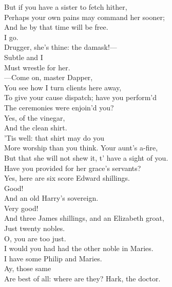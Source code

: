 \documentclass[a4paper,oneside]{memoir}
\begin{document}
\begin{drama*}
But if you have a sister to fetch hither,\\
Perhaps your own pains may command her sooner;\\
And he by that time will be free.\\
\kastrilspeaks {} I go.\\
\facespeaks Drugger, she's thine: the damask!---\\
Subtle and I\\
Must wrestle for her.\\
---Come on, master Dapper,\\
You see how I turn clients here away,\\
To give your cause dispatch; have you perform'd\\
The ceremonies were enjoin'd you?\\
\dapperspeaks {} Yes, of the vinegar,\\
And the clean shirt.\\
\facespeaks {} 'Tis well: that shirt may do you\\
More worship than you think. Your aunt's a-fire,\\
But that she will not shew it, t' have a sight of you.\\
Have you provided for her grace's servants?\\
\dapperspeaks Yes, here are six score Edward shillings.\\
\facespeaks {} Good!\\
\dapperspeaks And an old Harry's sovereign.\\
\facespeaks {} Very good!\\
\dapperspeaks And three James shillings, and an Elizabeth groat,\\
Just twenty nobles.\\
\facespeaks {} O, you are too just.\\
I would you had had the other noble in Maries.\\
\dapperspeaks I have some Philip and Maries.\\
\facespeaks {} Ay, those same\\
Are best of all: where are they? Hark, the doctor.\\

\end{drama*}
\end{document}
